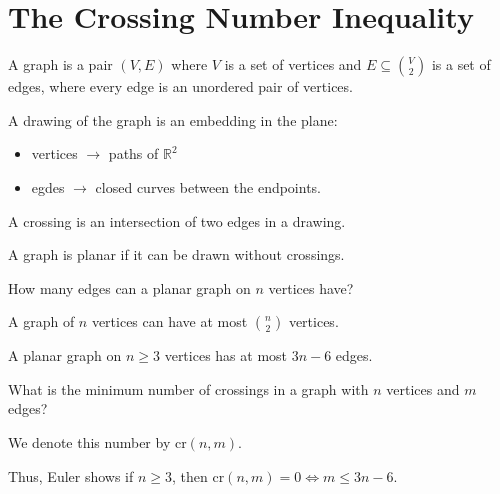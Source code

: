 \section{The Crossing Number Inequality}
\begin{definition}
    A graph is a pair \((V, E)\) where \(V\) is a set of vertices and \(E \subseteq \binom{V}{2}\) is a set of edges, where every edge is an unordered pair of vertices.   
\end{definition}

A drawing of the graph is an embedding in the plane:
\begin{itemize}
    \item vertices \(\to \) paths of \(\mathbb{R}^2\) 
    \item egdes \(\to \) closed curves between the endpoints.   
\end{itemize}

\begin{definition}
    A crossing is an intersection of two edges in a drawing.
\end{definition}

\begin{definition}
    A graph is planar if it can be drawn without crossings.
\end{definition}

\begin{question}
    How many edges can a planar graph on \(n\) vertices have? 
\end{question}

\begin{remark}
    A graph of \(n\) vertices can have at most \(\binom{n}{2}\) vertices.   
\end{remark}

\begin{theorem}[Euler]
    A planar graph on \(n \ge 3\) vertices has at most \(3n - 6\) edges.   
\end{theorem}

\begin{question}
    What is the minimum number of crossings in a graph with \(n\) vertices and \(m\) edges?  
\end{question}

\begin{notation}
    We denote this number by \(\mathrm{cr}(n, m) \). 
\end{notation}

Thus, Euler shows if \(n \ge 3\), then \(\mathrm{cr}(n, m) = 0 \iff m \le 3n - 6 \).

